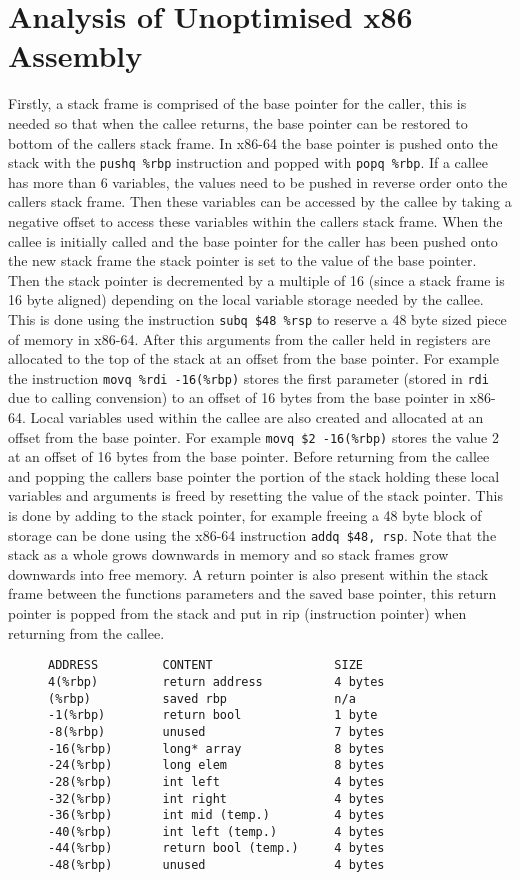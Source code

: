 \documentclass{article}
\begin{document}
\section{Analysis of Unoptimised x86 Assembly}
Firstly, a stack frame is comprised of the base pointer for the caller, this is needed so that when the callee returns, the base pointer can be restored to bottom of the callers stack frame. In x86-64 the base pointer is pushed onto the stack with the \verb+pushq %rbp+ instruction and popped with \verb+popq %rbp+. If a callee has more than 6 variables, the values need to be pushed in reverse order onto the callers stack frame. Then these variables can be accessed by the callee by taking a negative offset to access these variables within the callers stack frame. When the callee is initially called and the base pointer for the caller has been pushed onto the new stack frame the stack pointer is set to the value of the base pointer. Then the stack pointer is decremented by a multiple of 16 (since a stack frame is 16 byte aligned) depending on the local variable storage needed by the callee. This is done using the instruction \verb+subq $48 %rsp+ to reserve a 48 byte sized piece of memory in x86-64. After this arguments from the caller held in registers are allocated to the top of the stack at an offset from the base pointer. For example the instruction \verb+movq %rdi -16(%rbp)+ stores the first parameter (stored in \verb+rdi+ due to calling convension) to an offset of 16 bytes from the base pointer in x86-64. Local variables used within the callee are also created and allocated at an offset from the base pointer. For example \verb+movq $2 -16(%rbp)+ stores the value 2 at an offset of 16 bytes from the base pointer. Before returning from the callee and popping the callers base pointer the portion of the stack holding these local variables and arguments is freed by resetting the value of the stack pointer. This is done by adding to the stack pointer, for example freeing a 48 byte block of storage can be done using the x86-64 instruction \verb+addq $48, rsp+. Note that the stack as a whole grows downwards in memory and so stack frames grow downwards into free memory. A return pointer is also present within the stack frame between the functions parameters and the saved base pointer, this return pointer is popped from the stack and put in rip (instruction pointer) when returning from the callee.

\begin{figure}[H]
\centering \begin{BVerbatim}
ADDRESS         CONTENT                 SIZE
4(%
(%
-1(%
-8(%
-16(%
-24(%
-28(%
-32(%
-36(%
-40(%
-44(%
-48(%
\end{BVerbatim}
\end{figure}
\end{document}
